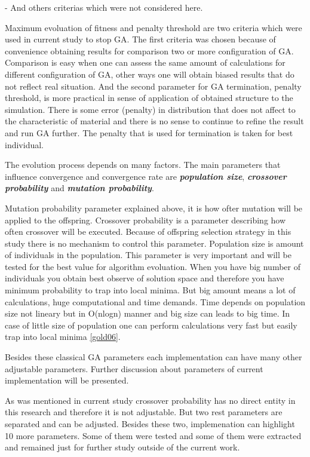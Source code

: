 \documentclass[12pt]{report}
\begin{document}
- And others criterias which were not considered here.

Maximum evoluation of fitness and penalty threshold are two criteria which were used in current study to stop GA. The first criteria was chosen because of convenience obtaining results for comparison two or more configuration of GA. Comparison is easy when one can assess the same amount of calculations for different configuration of GA, other ways one will obtain biased results that do not reflect real situation. And the second parameter for GA termination, penalty threshold, is more practical in sense of application of obtained structure to the simulation. There is some error (penalty) in distribution that does not affect to the characteristic of material and there is no sense to continue to refine the result and run GA further. The penalty that is used for termination is taken for best individual.

The evolution process depends on many factors. The main parameters that influence convergence and convergence rate are \textit{\textbf{population size}}, \textit{\textbf{crossover probability}} and \textit{\textbf{mutation probability}}.

Mutation probability parameter explained above, it is how ofter mutation will be applied to the offspring. Crossover probability is a parameter describing how often crossover will be executed. Because of offspring selection strategy in this study there is no mechanism to control this parameter. Population size is amount of individuals in the population. This parameter is very important and will be tested for the best value for algorithm evoluation. When you have big number of individuals you obtain best observe of solution space and therefore you have minimum probability to trap into local minima. But big amount means a lot of calculations, huge computational and time demands. Time depends on population size not lineary but in O(nlogn) manner and big size can leads to big time. In case of little size of population one can perform calculations very fast but easily trap into local minima \ref{gold06}.

Besides these classical GA parameters each implementation can have many other adjustable parameters. Further discussion about parameters of current implementation will be presented.

As was mentioned in current study crossover probability has no direct entity in this research and therefore it is not adjustable. But two rest parameters are separated and can be adjusted. Besides these two, implemenation can highlight 10 more parameters. Some of them were tested and some of them were extracted and remained just for further study outside of the current work.
\end{document}

